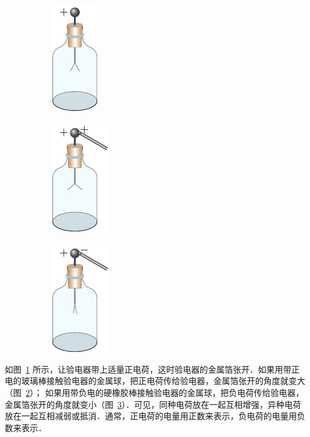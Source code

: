 \begin{figure}[htbp]
    \centering
    \begin{subfigure}{0.3\linewidth}
        \centering
        \includegraphics{fig/B/6-1a.pdf}
        \caption{}\label{fig_B_6-1a}
    \end{subfigure}
    \hfil
    \begin{subfigure}{0.3\linewidth}
        \centering
        \includegraphics{fig/B/6-1b.pdf}
        \caption{}\label{fig_B_6-1b}
    \end{subfigure}
    \hfil
    \begin{subfigure}{0.3\linewidth}
        \centering
        \includegraphics{fig/B/6-1c.pdf}
        \caption{}\label{fig_B_6-1c}
    \end{subfigure}
    \caption{}\label{fig_B_6-1}
\end{figure}

如图~\ref{fig_B_6-1a} 所示，让验电器带上适量正电荷，这时验电器的金属箔张开．如果用带正电的玻璃棒接触验电器的金属球，把正电荷传给验电器，金属箔张开的角度就变大（图~\ref{fig_B_6-1b}）；
如果用带负电的硬橡胶棒接触验电器的金属球，把负电荷传给验电器，金属箔张开的角度就变小（图~\ref{fig_B_6-1c}）．可见，同种电荷放在一起互相增强，异种电荷放在一起互相减弱或抵消．通常，正电荷的电量用正数来表示，负电荷的电量用负数来表示．


